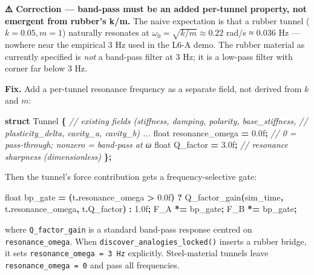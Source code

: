 \documentclass[
  11pt,
  a4paper,
]{article}
\newenvironment{Shaded}{\begin{snugshade}}{\end{snugshade}}
\newcommand{\BuiltInTok}[1]{#1}
\newcommand{\CommentTok}[1]{\textcolor[rgb]{0.56,0.35,0.01}{\textit{#1}}}
\newcommand{\DataTypeTok}[1]{\textcolor[rgb]{0.13,0.29,0.53}{#1}}
\newcommand{\FloatTok}[1]{\textcolor[rgb]{0.00,0.00,0.81}{#1}}
\newcommand{\KeywordTok}[1]{\textcolor[rgb]{0.13,0.29,0.53}{\textbf{#1}}}
\newcommand{\NormalTok}[1]{#1}
\newcommand{\OperatorTok}[1]{\textcolor[rgb]{0.81,0.36,0.00}{\textbf{#1}}}
\begin{document}
\textbf{⚠️ Correction --- band-pass must be an added per-tunnel
property, not emergent from rubber's k/m.} The naive expectation is that
a rubber tunnel (\(k=0.05, m=1\)) naturally resonates at
\(\omega_0 = \sqrt{k/m} \approx 0.22\) rad/s ≈ 0.036 Hz --- nowhere near
the empirical 3 Hz used in the L6-A demo. The rubber material as
currently specified is \emph{not} a band-pass filter at 3 Hz; it is a
low-pass filter with corner far below 3 Hz.

\textbf{Fix.} Add a per-tunnel resonance frequency as a separate field,
not derived from \(k\) and \(m\):

\begin{Shaded}
\begin{Highlighting}[]
\KeywordTok{struct}\NormalTok{ Tunnel }\OperatorTok{\{}
    \CommentTok{// existing fields (stiffness, damping, polarity, base\_stiffness,}
    \CommentTok{//                  plasticity\_delta, cavity\_a, cavity\_b) ...}
    \DataTypeTok{float}\NormalTok{ resonance\_omega }\OperatorTok{=} \FloatTok{0.0}\BuiltInTok{f}\OperatorTok{;}   \CommentTok{// 0 = pass{-}through; nonzero = band{-}pass at ω}
    \DataTypeTok{float}\NormalTok{ Q\_factor        }\OperatorTok{=} \FloatTok{3.0}\BuiltInTok{f}\OperatorTok{;}   \CommentTok{// resonance sharpness (dimensionless)}
\OperatorTok{\};}
\end{Highlighting}
\end{Shaded}

Then the tunnel's force contribution gets a frequency-selective gate:

\begin{Shaded}
\begin{Highlighting}[]
\DataTypeTok{float}\NormalTok{ bp\_gate }\OperatorTok{=} \OperatorTok{(}\NormalTok{t}\OperatorTok{.}\NormalTok{resonance\_omega }\OperatorTok{\textgreater{}} \FloatTok{0.0}\BuiltInTok{f}\OperatorTok{)}
              \OperatorTok{?}\NormalTok{ Q\_factor\_gain}\OperatorTok{(}\NormalTok{sim\_time}\OperatorTok{,}\NormalTok{ t}\OperatorTok{.}\NormalTok{resonance\_omega}\OperatorTok{,}\NormalTok{ t}\OperatorTok{.}\NormalTok{Q\_factor}\OperatorTok{)}
              \OperatorTok{:} \FloatTok{1.0}\BuiltInTok{f}\OperatorTok{;}
\NormalTok{F\_A }\OperatorTok{*=}\NormalTok{ bp\_gate}\OperatorTok{;}
\NormalTok{F\_B }\OperatorTok{*=}\NormalTok{ bp\_gate}\OperatorTok{;}
\end{Highlighting}
\end{Shaded}

where \texttt{Q\_factor\_gain} is a standard band-pass response centred
on \texttt{resonance\_omega}. When
\texttt{discover\_analogies\_locked()} inserts a rubber bridge, it sets
\texttt{resonance\_omega\ =\ 3\ Hz} explicitly. Steel-material tunnels
leave \texttt{resonance\_omega\ =\ 0} and pass all frequencies.
\end{document}
